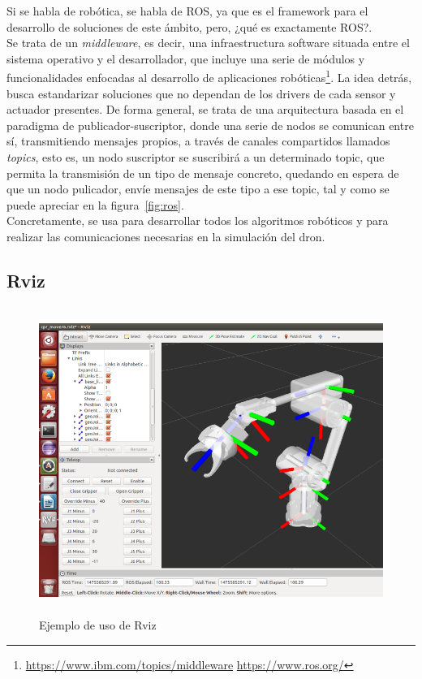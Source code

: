 Si se habla de robótica, se habla de \ac{ROS}, ya que es el framework para el desarrollo de soluciones de este ámbito, pero, ¿qué es exactamente \ac{ROS}?.\\

Se trata de un \emph{middleware}, es decir, una infraestructura software situada entre el sistema operativo y el desarrollador, que incluye una serie de módulos y funcionalidades enfocadas al desarrollo de aplicaciones robóticas\footnote[6]{\url{https://www.ibm.com/topics/middleware} \url{https://www.ros.org/}}. La idea detrás, busca estandarizar soluciones que no dependan de los drivers de cada sensor y actuador presentes. De forma general, se trata de una arquitectura basada en el paradigma de publicador-suscriptor, donde una serie de nodos se comunican entre sí, transmitiendo mensajes propios, a través de canales compartidos llamados \emph{topics}, esto es, un nodo suscriptor se suscribirá a un determinado topic, que permita la transmisión de un tipo de mensaje concreto, quedando en espera de que un nodo pulicador, envíe mensajes de este tipo a ese topic, tal y como se puede apreciar en la figura~\ref{fig:ros}.\\

Concretamente, se usa para desarrollar todos los algoritmos robóticos y para realizar las comunicaciones necesarias en la simulación del dron.\\

\subsection{Rviz}
\label{subsec:rviz}

\begin{figure} [t]
	\begin{center}
	\includegraphics[height=10cm]{imagenes/cap3/3_rviz_example.png}
	\end{center}
	\caption[Ejemplo de uso de Rviz]{Ejemplo de uso de Rviz}
	\label{fig:rviz}
\end{figure}

